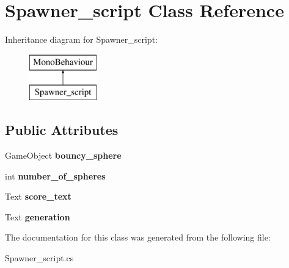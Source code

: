 \hypertarget{class_spawner__script}{}\section{Spawner\+\_\+script Class Reference}
\label{class_spawner__script}
Inheritance diagram for Spawner\+\_\+script\+:\begin{figure}[H]
\begin{center}
\leavevmode
\includegraphics[height=2.000000cm]{class_spawner__script}
\end{center}
\end{figure}
\subsection*{Public Attributes}
\begin{DoxyCompactItemize}
\item 
\mbox{\label{class_spawner__script_a4b593dd5c7b994bb6523dc78d6bd3f13}} 
Game\+Object {\bfseries bouncy\+\_\+sphere}
\item 
\mbox{\label{class_spawner__script_a14059722a1060ab254c0cd7d3cd32a3d}} 
int {\bfseries number\+\_\+of\+\_\+spheres}
\item 
\mbox{\label{class_spawner__script_a574293fd2bd83ec6908ab201552614af}} 
Text {\bfseries score\+\_\+text}
\item 
\mbox{\label{class_spawner__script_ab0a8dfbe340082ddf00fd81be1d7e7af}} 
Text {\bfseries generation}
\end{DoxyCompactItemize}


The documentation for this class was generated from the following file\+:\begin{DoxyCompactItemize}
\item 
Spawner\+\_\+script.\+cs\end{DoxyCompactItemize}

